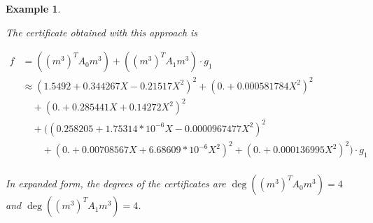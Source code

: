 \documentclass[preprint,12pt,authoryear]{elsarticle}
\newtheorem{example}[theorem]{Example}
\newenvironment{example1}
  {\begin{example}\rm}
  {\end{example}}
\begin{document}
\begin{example1}
\begin{itemize}
    The certificate obtained with this approach is 

    {
      \small
      \begin{equation*} 
        \begin{split}
          f &= ((m^{3})^{T} A_0 m^{3}) + ((m^{3})^{T} A_1 m^{3}) \cdot g_1\\
            &\approx (1.5492 +0.344267 X-0.21517 X^2)^2+(0. +0.000581784
              X^2)^2\\
            &\quad+(0. +0.285441 X+0.14272 X^2)^2\\
            &\quad+((0.258205 +1.75314*10^{-6} X-0.0000967477 X^2)^2\\
            &\quad\quad+(0. +0.00708567
              X+6.68609*10^{-6} X^2)^2+(0. +0.000136995 X^2)^2) \cdot g_1\\
        \end{split}
      \end{equation*}
    }

    In expanded form, the degrees of the certificates are $\deg((m^{3})^{T} A_0
    m^{3}) = 4$ and $\deg((m^{3})^{T} A_1 m^{3}) = 4$.
  \end{itemize}
\end{example1}
\end{document}

